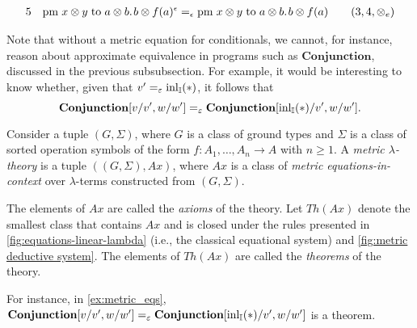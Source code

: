 \begin{example}
\begin{equation*}
\begin{split}
  5\hspace{10 pt}& \text{pm} \hspace{3 pt} x \otimes y\hspace{3 pt} \text{to} \hspace{3 pt} a \otimes b. \hspace{1pt} b \otimes f(a)^{\epsilon} =_{\epsilon} \text{pm} \hspace{3 pt} x \otimes y\hspace{3 pt} \text{to} \hspace{3 pt} a \otimes b. \hspace{1pt} b \otimes f(a) & \hspace{10pt} \text{($3,4,\otimes_e$)}
  \end{split}
  \end{equation*}
\end{example}


Note that without a metric equation for conditionals, we cannot, for instance, reason about approximate equivalence in programs such as  $\textbf{Conjunction}$, discussed in the previous subsubsection. For example, it would be interesting to know whether, given that \( v' =_{\varepsilon} \mathrm{inl}_{\mathbb{I}}(*) \), it follows that
\[
\textbf{Conjunction}[v/v', w/w'] =_{\varepsilon} \textbf{Conjunction}[\mathrm{inl}_{\mathbb{I}}(*)/v', w/w'].
\]


\begin{definition} \label{def:metric_lambda_theory}
  Consider a tuple \( (G, \Sigma) \), where \( G \) is a class of ground types and \( \Sigma \) is a class of sorted operation symbols of the form \( f : A_1, \ldots, A_n \to A \) with \( n \geq 1 \). A \emph{metric $\lambda$-theory} is a tuple \( ((G, \Sigma), Ax) \), where \( Ax \) is a class of \emph{metric equations-in-context} over  $\lambda$-terms constructed from \( (G, \Sigma) \).
\end{definition}

The elements of \( Ax \) are called the \emph{axioms} of the theory. Let \( Th(Ax) \) denote the smallest class that contains \( Ax \) and is closed under the rules presented in \autoref{fig:equations-linear-lambda} (i.e., the classical equational system) and \autoref{fig:metric deductive system}. The elements of \( Th(Ax) \) are called the \emph{theorems} of the theory.

For instance, in \autoref{ex:metric_eqs}, $\textbf{Conjunction}[v/v', w/w'] =_{\varepsilon} \textbf{Conjunction}[\mathrm{inl}_{\mathbb{I}}(*)/v', w/w']$ is a theorem.



